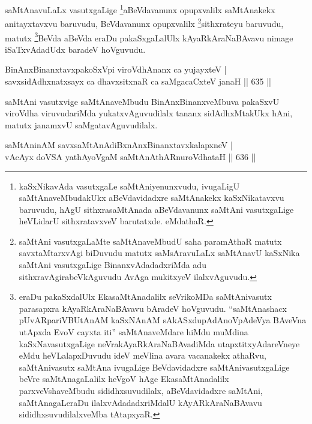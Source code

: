 \begin{artha}
saMtAnavuLaLx vasutxgaLige \footnote[1]{kaSxNikavAda vasutxgaLe saMtAniyenunxvudu, ivugaLigU saMtAnaveMbudakUkx aBeVdavidadxre saMtAnakekx kaSxNikatavxvu baruvudu, hAgU sithxrasaMtAnada aBeVdavanunx saMtAni vasutxgaLige heVLidarU sithxratavxveV barutatxde. eMdathaR.}aBeVdavanunx opupxvalilx saMtAnakekx anitayxtavxvu baruvudu, BeVdavanunx opupxvalilx \footnote{saMtAni vasutxgaLaMte saMtAnaveMbudU saha paramAthaR matutx savxtaMtarxvAgi biDuvudu matutx saMsAravuLaLx saMtAnavU kaSxNika saMtAni vasutxgaLige BinanxvAdadadxriMda adu sithxravAgirabeVkAguvudu AvAga mukitxyeV ilalxvAguvudu.}sithxrateyu baruvudu, matutx \footnote[2]{eraDu pakaSxdalUlx EkasaMtAnadalilx seVrikoMDa saMtAnivasutx parasapxra kAyaRkAraNaBAvavu bAradeV hoVguvudu. ``saMtAnashacx pUvARpariVBUtAnAM kaSxNAnAM sAkASxdupAdAnoVpAdeVya BAveVna utApxda EvoV cayxta iti'' saMtAnaveMdare hiMdu muMdina kaSxNavasutxgaLige neVrakAyaRkAraNaBAvadiMda utapxtitxyAdareVneye eMdu heVLalapxDuvudu ideV meVlina avara vacanakekx athaRvu, saMtAnivasutx saMtAna ivugaLige BeVdavidadxre saMtAnivasutxgaLige beVre saMtAnagaLalilx heVgoV hAge EkasaMtAnadalilx parxveVshaveMbudu sididhxsuvudilalx, aBeVdavidadxre saMtAni, saMtAnagaLeraDu ilalxvAdadadxriMdalU kAyARkAraNaBAvavu sididhxsuvudilalxveMba tAtapxyaR.}BeVda aBeVda eraDu pakaSxgaLalUlx kAyaRkAraNaBAvavu nimage iSaTxvAdadUdx baradeV hoVguvudu.
\end{artha}


\begin{shl}
BinAnxBinanxtavxpakoSxV\s pi \footnotemark[3]viroVdhAnanx ca yujayxteV | \\
savxsidAdhxnatxsayx ca dhavxsitxnaR ca saMgacaCxteV janaH \hfill||  635 ||  
\end{shl}

\begin{artha}
saMtAni vasutxvige saMtAnaveMbudu BinAnxBinanxveMbuva pakaSxvU viroVdha viruvudariMda yukatxvAguvudilalx tananx sidAdhxMtakUkx hAni, matutx janamxvU saMgatavAguvudilalx.
\end{artha}

\begin{shl}
saMtAninAM savxsaMtAnAdiBxnAnxBinanxtavxkalapxneV | \\
vAcAyx doVSA yathAyoVgaM saMtAnAthARnuroVdhataH \hfill ||  636 ||  
\end{shl}

